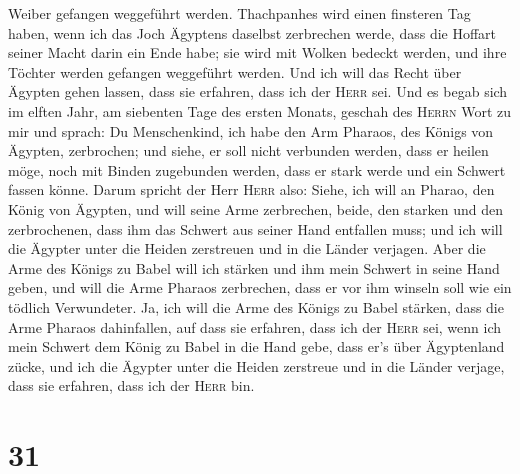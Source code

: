 Weiber gefangen weggeführt werden.  Thachpanhes wird
einen finsteren Tag haben, wenn ich das Joch Ägyptens daselbst
zerbrechen werde, dass die Hoffart seiner Macht darin ein Ende habe; sie
wird mit Wolken bedeckt werden, und ihre Töchter werden gefangen
weggeführt werden.  Und ich will das Recht über Ägypten
gehen lassen, dass sie erfahren, dass ich der \textsc{Herr} sei.
 Und es begab sich im elften Jahr, am siebenten Tage des
ersten Monats, geschah des \textsc{Herrn} Wort zu mir und sprach:
 Du Menschenkind, ich habe den Arm Pharaos, des Königs
von Ägypten, zerbrochen; und siehe, er soll nicht verbunden werden, dass
er heilen möge, noch mit Binden zugebunden werden, dass er stark werde
und ein Schwert fassen könne.  Darum spricht der Herr
\textsc{Herr} also: Siehe, ich will an Pharao, den König von Ägypten,
und will seine Arme zerbrechen, beide, den starken und den zerbrochenen,
dass ihm das Schwert aus seiner Hand entfallen muss;  und
ich will die Ägypter unter die Heiden zerstreuen und in die Länder
verjagen.  Aber die Arme des Königs zu Babel will ich
stärken und ihm mein Schwert in seine Hand geben, und will die Arme
Pharaos zerbrechen, dass er vor ihm winseln soll wie ein tödlich
Verwundeter.  Ja, ich will die Arme des Königs zu Babel
stärken, dass die Arme Pharaos dahinfallen, auf dass sie erfahren, dass
ich der \textsc{Herr} sei, wenn ich mein Schwert dem König zu Babel in
die Hand gebe, dass er's über Ägyptenland zücke,  und ich
die Ägypter unter die Heiden zerstreue und in die Länder verjage, dass
sie erfahren, dass ich der \textsc{Herr} bin.

\hypertarget{section-30}{%
\section{31}\label{section-30}}

